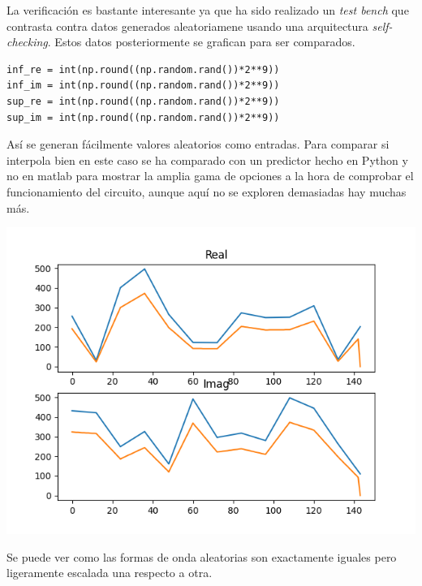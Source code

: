 \documentclass[11pt]{scrartcl} %
\begin{document}
\begin{preview}
La verificación es bastante interesante ya que ha sido realizado un \emph{test bench} que contrasta contra datos generados aleatoriamene usando una arquitectura \emph{self-checking}. Estos datos posteriormente se grafican para ser comparados.

\begin{verbatim}
inf_re = int(np.round((np.random.rand())*2**9))
inf_im = int(np.round((np.random.rand())*2**9))
sup_re = int(np.round((np.random.rand())*2**9))
sup_im = int(np.round((np.random.rand())*2**9))
\end{verbatim}

Así se generan fácilmente valores aleatorios como entradas. Para comparar si interpola bien en este caso se ha comparado con un predictor hecho en Python y no en matlab para mostrar la amplia gama de opciones a la hora de comprobar el funcionamiento del circuito, aunque aquí no se exploren demasiadas hay muchas más.

\begin{minipage}{\linewidth}
	\begin{center}
		\includegraphics[width=1\columnwidth,trim={0 0.5cm 1cm 0.5cm},clip]{../../Linux/Trabajo/InterpoladorCCTb/imgs/interpolador_real_imag_sub_rand_superpuestas.png} %
	\end{center}
	\label{interpolate}
\end{minipage}

Se puede ver como las formas de onda aleatorias son exactamente iguales pero ligeramente escalada una respecto a otra.


\end{preview}
\end{document}
